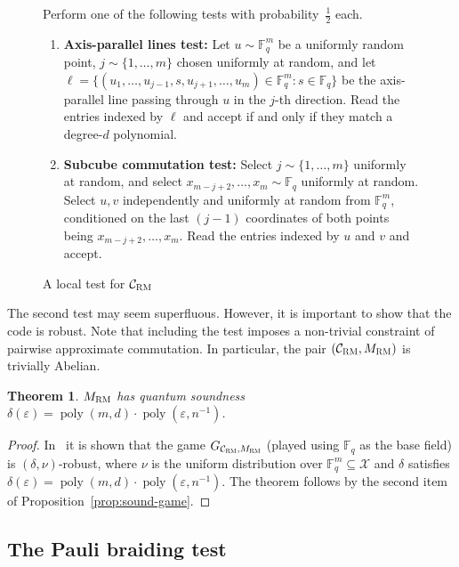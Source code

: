 \documentclass[11pt]{article}
\newtheorem{theorem}{Theorem}[section]
\theoremstyle{definition}
\newcommand{\code}{\mathcal{C}}
\newcommand{\F}{\ensuremath{\mathbb{F}}}
\newcommand{\mX}{\ensuremath{\mathcal{X}}}
\newcommand{\RM}{\ensuremath{\textsc{RM}}}
\DeclareMathOperator{\poly}{poly}
\newcommand{\eps}{\varepsilon}
\newenvironment{gamespec}{
  \begin{mdframed}[style=figstyle]}{
  \end{mdframed}}
\begin{document}
\begin{figure}[!htbp]
  \centering
  \begin{gamespec}
Perform one of the following tests with probability~$\tfrac{1}{2}$ each. 
\begin{enumerate}
	\item \textbf{Axis-parallel lines test:}
		Let $u \sim \F_q^m$ be a uniformly random point, $j\sim \{1,\ldots,m\}$ chosen uniformly at random,
		and let $\ell = \{ (u_1,\ldots,u_{j-1},s,u_{j+1},\ldots,u_m) \in \F_q^m : s \in \F_q \}$
		be the axis-parallel line passing through $u$ in the $j$-th direction. Read the entries indexed by $\ell$ and accept if and only if they match a degree-$d$ polynomial. 
	\item \textbf{Subcube commutation test:}
	Select $j \sim \{1,\ldots,m\}$ uniformly at random, and select $x_{m-j+2},\ldots,x_{m} \sim \F_q$ uniformly at random. Select $u,v$ independently and uniformly at random from $\F_q^m$, conditioned on the last $(j-1)$ coordinates of both points being $x_{m-j+2},\ldots,x_m$. Read the entries indexed by $u$ and $v$ and accept. 	
    \end{enumerate}
  \end{gamespec}
  \caption{A local test for $\code_{\RM}$}
  \label{fig:RM-tester}
\end{figure}

The second test may seem superfluous. However, it is important to show that the code is robust. Note that including the test imposes a non-trivial constraint of pairwise approximate commutation. In particular, the pair $(\code_\RM,M_\RM)$ is trivially Abelian. 


\begin{theorem}\label{thm:mrm-sound}
$M_\RM$ has quantum soundness $\delta(\eps)=\poly(m,d)\cdot \poly(\eps,n^{-1})$.
\end{theorem}

\begin{proof}
In~\cite{ji2022quantum} it is shown that the game $G_{\code_\RM,M_\RM}$ (played using $\F_q$ as the base field) is $(\delta,\nu)$-robust, where $\nu$ is the uniform distribution over $\F_q^m \subseteq \mX$ and $\delta$ satisfies $\delta(\eps)=\poly(m,d)\cdot \poly(\eps,n^{-1})$. The theorem follows by the second item of Proposition~\ref{prop:sound-game}. 
\end{proof}


\subsection{The Pauli braiding test}
\end{document}

